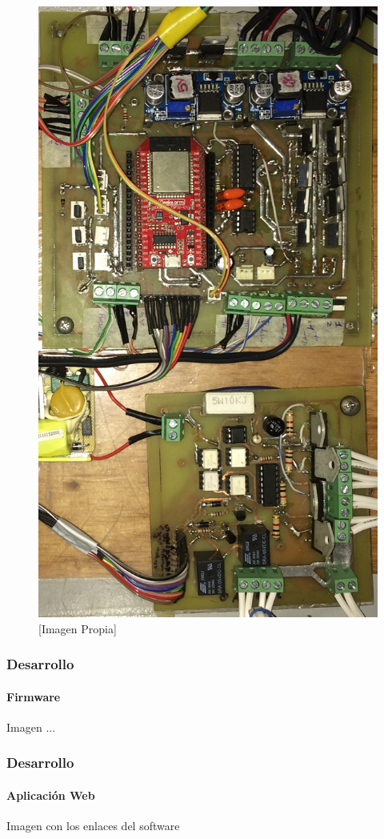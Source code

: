 \begin{frame}
\begin{multicols}{2}
\begin{figure}[!]
	\caption{[Imagen Propia]}
	\label{fig:prot}
	\includegraphics[width=\linewidth]{Imagenes/Tarjeta.jpg}
\end{figure}

\end{multicols}
\end{frame}

\begin{frame}
\frametitle{Desarrollo}
\framesubtitle{Firmware}

Imagen ...

\end{frame}

\begin{frame}
\frametitle{Desarrollo}
\framesubtitle{Aplicación Web}

Imagen con los enlaces del software

\end{frame}